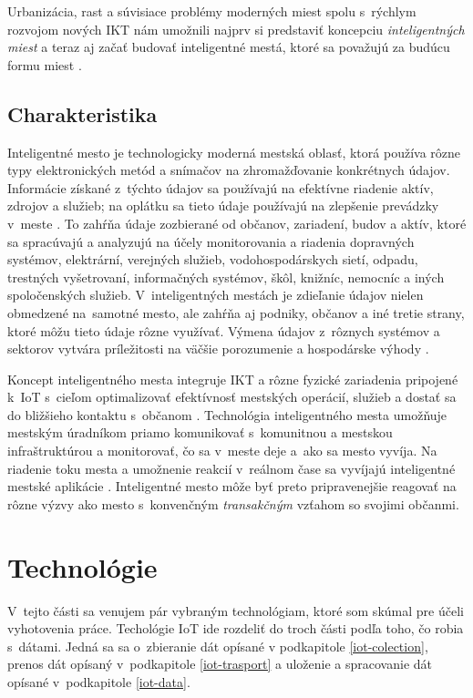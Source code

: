 Urbanizácia, rast a súvisiace problémy moderných miest spolu s~rýchlym rozvojom nových IKT nám umožnili najprv si predstaviť koncepciu \emph{inteligentných miest} a teraz aj začať budovať inteligentné mestá, ktoré sa považujú za budúcu formu miest \cite{Yin2015}.

\subsection{Charakteristika}
Inteligentné mesto je technologicky moderná mestská oblasť, ktorá používa rôzne typy elektronických metód a snímačov na zhromažďovanie konkrétnych údajov. 
Informácie získané z~týchto údajov sa používajú na efektívne riadenie aktív, zdrojov a služieb; na oplátku sa tieto údaje používajú na zlepšenie prevádzky v~meste \cite{goldsmith2021define}. 
To zahŕňa údaje zozbierané od občanov, zariadení, budov a aktív, ktoré sa spracúvajú a analyzujú na účely monitorovania a riadenia dopravných systémov, elektrární, verejných služieb, vodohospodárskych sietí, odpadu, trestných vyšetrovaní, informačných systémov, škôl, knižníc, nemocníc a iných spoločenských služieb. 
V~inteligentných mestách je zdieľanie údajov nielen obmedzené na~samotné mesto, ale zahŕňa aj podniky, občanov a iné tretie strany, ktoré môžu tieto údaje rôzne využívať. 
Výmena údajov z~rôznych systémov a sektorov vytvára príležitosti na väčšie porozumenie a hospodárske výhody \cite{paiho2022opportunities}.

Koncept inteligentného mesta integruje IKT a rôzne fyzické zariadenia pripojené k~IoT s~cieľom optimalizovať efektívnosť mestských operácií, služieb a dostať sa do bližšieho kontaktu s~občanom \cite{gracia2018sustainable}. 
Technológia inteligentného mesta umožňuje mestským úradníkom priamo komunikovať s~komunitnou a mestskou infraštruktúrou a monitorovať, čo sa v~meste deje a~ako sa mesto vyvíja. 
Na riadenie toku mesta a umožnenie reakcií v~reálnom čase sa vyvíjajú inteligentné mestské aplikácie \cite{komninos2013makes}. 
Inteligentné mesto môže byť preto pripravenejšie reagovať na rôzne výzvy ako mesto s~konvenčným \emph{transakčným} vzťahom so svojimi občanmi.

\section{Technológie}\label{Iot-technology}
V~tejto části sa venujem pár vybraným technológiam, ktoré som skúmal pre účeli vyhotovenia práce. 
Techológie IoT ide rozdeliť do troch části podľa toho, čo robia s~dátami. 
Jedná sa sa o~zbieranie dát opísané v podkapitole \ref{iot-colection}, prenos dát opísaný v~podkapitole \ref{iot-trasport} a uloženie a spracovanie dát opísané v~podkapitole \ref{iot-data}.


